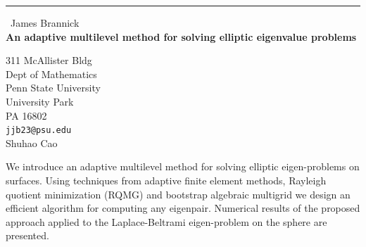 \documentclass{report}
\begin{document}
\begin{center}
\rule{6in}{1pt} \
{\large James Brannick \\
{\bf An adaptive multilevel method for solving elliptic eigenvalue problems}}

311 McAllister Bldg \\ Dept of Mathematics \\ Penn State University \\ University Park \\ PA 16802
\\
{\tt jjb23@psu.edu}\\
Shuhao Cao\end{center}

We introduce an adaptive multilevel method for solving elliptic
eigen-problems on surfaces. Using techniques from adaptive finite element
methods, Rayleigh quotient minimization (RQMG) and bootstrap algebraic
multigrid we design an efficient algorithm for computing any eigenpair.
Numerical results of the proposed approach applied to the
Laplace-Beltrami eigen-problem on the sphere
are presented.
\end{document}
